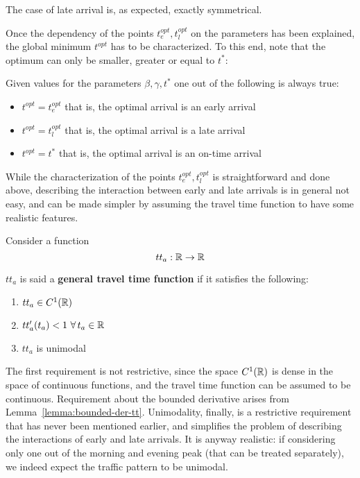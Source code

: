 The case of late arrival is, as expected, exactly symmetrical.

Once the dependency of the points \(t_e^{opt}, t_l^{opt}\) on the parameters has been explained,
the global minimum \(t^{opt}\) has to be characterized.
To this end, note that the optimum can only be smaller, greater or equal to \(t^*\):
\begin{obs}
  \label{obs:t_opt-dep}
  Given values for the parameters \(\beta, \gamma, t^*\) one out of the following is always true:
  \begin{itemize}
  \item \(t^{opt} = t_e^{opt}\) that is, the optimal arrival is an early arrival
  \item \(t^{opt} = t_l^{opt}\) that is, the optimal arrival is a late arrival
  \item \(t^{opt} = t^*\) that is, the optimal arrival is an on-time arrival
  \end{itemize}
\end{obs}

While the characterization of the points \(t_e^{opt}, t_l^{opt}\) is straightforward and done above,
describing the interaction between early and late arrivals is in general not easy,
and can be made simpler by assuming the travel time function to have some realistic features.

\begin{definition}
  \label{def:gen-tt-fun}
  Consider a function
  \begin{equation*}
    tt_a: \mathbb{R} \rightarrow \mathbb{R}
  \end{equation*}

  \(tt_a\) is said a \textbf{general travel time function} if it satisfies the following:
  \begin{enumerate}
  \item \(tt_a \in C^1(\mathbb{R})\)
  \item \(tt_a'(t_a) < 1\ \forall\, t_a\in \mathbb{R}\)
  \item \(tt_a\) is unimodal
  \end{enumerate}
\end{definition}

The first requirement is not restrictive,
since the space \(C^1(\mathbb{R})\) is dense in the space of continuous functions,
and the travel time function can be assumed to be continuous.
Requirement about the bounded derivative arises from Lemma~\ref{lemma:bounded-der-tt}.
Unimodality, finally, is a restrictive requirement that has never been mentioned earlier,
and simplifies the problem of describing the interactions of early and late arrivals.
It is anyway realistic:
if considering only one out of the morning and evening peak (that can be treated separately),
we indeed expect the traffic pattern to be unimodal.

